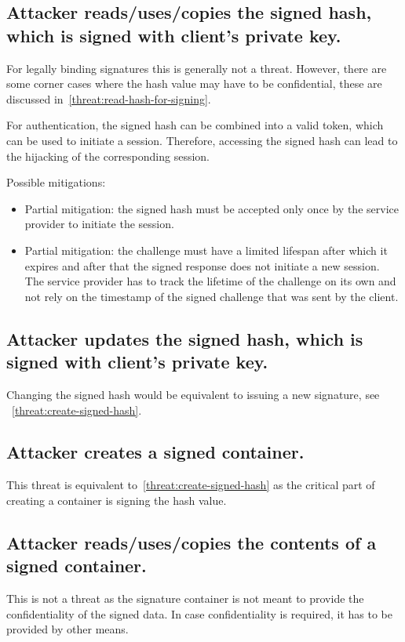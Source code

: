 \subsection{Attacker reads/uses/copies the signed hash, which is signed with client's private key.}
\label{threat:read-signed-hash}
For legally binding signatures this is generally not a threat. However, there are some corner cases where the hash value may have to be confidential, these are discussed in~\ref{threat:read-hash-for-signing}.

For authentication, the signed hash can be combined into a valid token, which can be used to initiate a session. Therefore, accessing the signed hash can lead to the hijacking of the corresponding session.

Possible mitigations:
\begin{itemize}
\item Partial mitigation: the signed hash must be accepted only once by the service provider to initiate the session.
\item Partial mitigation: the challenge must have a limited lifespan after which it expires and after that the signed response does not initiate a new session. The service provider has to track the lifetime of the challenge on its own and not rely on the timestamp of the signed challenge that was sent by the client.
\end{itemize}


\subsection{Attacker updates the signed hash, which is signed with client's private key.}
\label{threat:update-signed-hash}
Changing the signed hash would be equivalent to issuing a new signature, see ~\ref{threat:create-signed-hash}.






\subsection{Attacker creates a signed container.}
\label{threat:create-signed-container}
This threat is equivalent to~\ref{threat:create-signed-hash} as the critical part of creating a container is signing the hash value. 


\subsection{Attacker reads/uses/copies the contents of a signed container.}
\label{threat:read-signed-container}
This is not a threat as the signature container is not meant to provide the confidentiality of the signed data. In case confidentiality is required, it has to be provided by other means.







